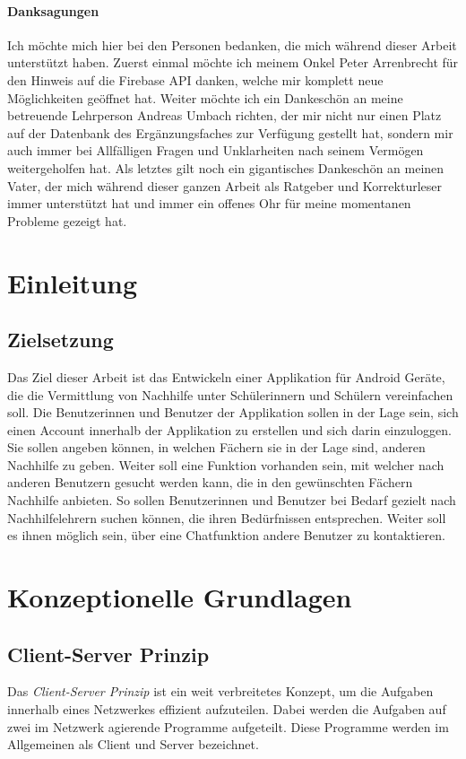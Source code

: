 \documentclass[a4paper,11pt]{report}
\begin{document}
	\subsubsection*{Danksagungen}
	Ich möchte mich hier bei den Personen bedanken, die mich während dieser Arbeit unterstützt haben. Zuerst einmal möchte ich meinem Onkel Peter Arrenbrecht für den Hinweis auf die Firebase API danken, welche mir komplett neue Möglichkeiten geöffnet hat. Weiter möchte ich ein Dankeschön an meine betreuende Lehrperson Andreas Umbach richten, der mir nicht nur einen Platz auf der Datenbank des Ergänzungsfaches zur Verfügung gestellt hat, sondern mir auch immer bei Allfälligen Fragen und Unklarheiten nach seinem Vermögen weitergeholfen hat. Als letztes gilt noch ein gigantisches Dankeschön an meinen Vater, der mich während dieser ganzen Arbeit als Ratgeber und Korrekturleser immer unterstützt hat und immer ein offenes Ohr für meine momentanen Probleme gezeigt hat.

	\tableofcontents
	
	
	\chapter{Einleitung}
		\section{Zielsetzung}
		Das Ziel dieser Arbeit ist das Entwickeln einer Applikation für Android Geräte, die die Vermittlung von Nachhilfe unter Schülerinnern und Schülern vereinfachen soll. Die Benutzerinnen und Benutzer der Applikation sollen in der Lage sein, sich einen Account innerhalb der Applikation zu erstellen und sich darin einzuloggen. Sie sollen angeben können, in welchen Fächern sie in der Lage sind, anderen Nachhilfe zu geben. Weiter soll eine Funktion vorhanden sein, mit welcher nach anderen Benutzern gesucht werden kann, die in den gewünschten Fächern Nachhilfe anbieten. So sollen Benutzerinnen und Benutzer bei Bedarf gezielt nach Nachhilfelehrern suchen können, die ihren Bedürfnissen entsprechen. Weiter soll es ihnen möglich sein, über eine Chatfunktion andere Benutzer zu kontaktieren.
	
	\chapter{Konzeptionelle Grundlagen} \label{konzepte}
		\section{Client-Server Prinzip}
		Das \emph{Client-Server Prinzip} ist ein weit verbreitetes Konzept, um die Aufgaben innerhalb eines Netzwerkes effizient aufzuteilen. Dabei werden die Aufgaben auf zwei im Netzwerk agierende Programme aufgeteilt. Diese Programme werden im Allgemeinen als Client und Server bezeichnet.
	 
\end{document}
